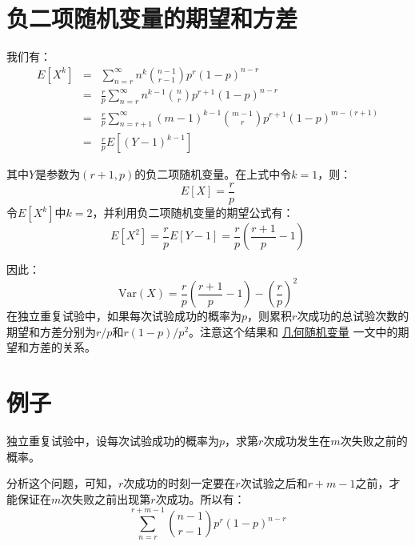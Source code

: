 \documentclass[10pt,a4paper,UTF8]{article}
\begin{document}
\section{负二项随机变量的期望和方差}
\label{sec:orga924efc}


我们有：
\begin{eqnarray}
\label{eq:3}
E[X^{k}] &=& \sum_{n=r}^{\infty}n^{k}\binom{n-1}{r-1}p^{r}(1-p)^{n-r}\\
&=& \frac{r}{p}\sum_{n=r}^{\infty} n^{k-1}\binom{n}{r}p^{r+1}(1-p)^{n-r} \\
&=& \frac{r}{p} \sum_{n=r+1}^{\infty} (m-1)^{k-1} \binom{m-1}{r}p^{r+1}(1-p)^{m-(r+1)} \\
&=&\frac{r}{p}E[(Y-1)^{k-1}]
\end{eqnarray}

其中\(Y\)是参数为\((r+1,p)\)的负二项随机变量。在上式中令\(k=1\)，则：
\begin{equation}
\label{eq:4}
E[X] = \frac{r}{p}
\end{equation}
令\(E[X^{k}]\)中\(k=2\)，并利用负二项随机变量的期望公式有：
\begin{equation}
\label{eq:5}
E[X^{2}] = \frac{r}{p}E[Y-1] = \frac{r}{p}(\frac{r+1}{p} - 1)
\end{equation}

因此：
\begin{equation}
\label{eq:6}
\mathrm{Var}(X) = \frac{r}{p}( \frac{r+1}{p} -1) - (\frac{r}{p})^{2}
\end{equation}
在独立重复试验中，如果每次试验成功的概率为\(p\)，则累积\(r\)次成功的总试验次数的期望和方差分别为\(r/p\)和\(r(1-p)/p^{2}\)。注意这个结果和 \href{geometry-distribution.org}{几何随机变量} 一文中的期望和方差的关系。
\section{例子}
\label{sec:orge3abb80}


\begin{tikzproblem}
独立重复试验中，设每次试验成功的概率为\(p\)，求第\(r\)次成功发生在\(m\)次失败之前的概率。
\end{tikzproblem}

\begin{tikzanswer}
分析这个问题，可知，\(r\)次成功的时刻一定要在\(r\)次试验之后和\(r+m-1\)之前，才能保证在\(m\)次失败之前出现第\(r\)次成功。所以有：
\begin{equation}
\label{eq:7}
\sum_{n=r}^{r+m-1}\binom{n-1}{r-1}p^{r}(1-p)^{n-r}
\end{equation}
\end{tikzanswer}
\end{document}

